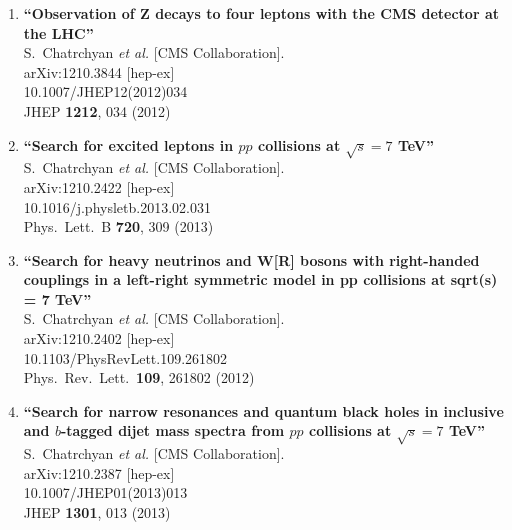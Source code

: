 \documentclass{article}
\begin{document}
\begin{enumerate}
\item%
{\bf ``Observation of Z decays to four leptons with the CMS detector at the LHC''}
  \\{}S.~Chatrchyan {\it et al.}  [CMS Collaboration].
  \\{}arXiv:1210.3844 [hep-ex]
    \\{}10.1007/JHEP12(2012)034
\\{}JHEP {\bf 1212}, 034 (2012) %


\item%
{\bf ``Search for excited leptons in $pp$ collisions at $\sqrt{s}=7$ TeV''}
  \\{}S.~Chatrchyan {\it et al.}  [CMS Collaboration].
  \\{}arXiv:1210.2422 [hep-ex]
    \\{}10.1016/j.physletb.2013.02.031
\\{}Phys.\ Lett.\ B {\bf 720}, 309 (2013) %


\item%
{\bf ``Search for heavy neutrinos and W[R] bosons with right-handed couplings in a left-right symmetric model in pp collisions at sqrt(s) = 7 TeV''}
  \\{}S.~Chatrchyan {\it et al.}  [CMS Collaboration].
  \\{}arXiv:1210.2402 [hep-ex]
    \\{}10.1103/PhysRevLett.109.261802
\\{}Phys.\ Rev.\ Lett.\  {\bf 109}, 261802 (2012) %


\item%
{\bf ``Search for narrow resonances and quantum black holes in inclusive and $b$-tagged dijet mass spectra from $pp$ collisions at $\sqrt{s}=7$ TeV''}
  \\{}S.~Chatrchyan {\it et al.}  [CMS Collaboration].
  \\{}arXiv:1210.2387 [hep-ex]
    \\{}10.1007/JHEP01(2013)013
\\{}JHEP {\bf 1301}, 013 (2013) %



\end{enumerate}
\end{document}
